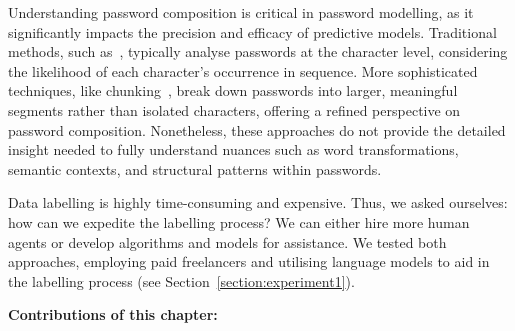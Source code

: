 

Understanding password composition is critical in password modelling, as it significantly impacts the precision and efficacy of predictive models. Traditional methods, such as~\cite{narayanan_fast_2005}, typically analyse passwords at the character level, considering the likelihood of each character's occurrence in sequence. More sophisticated techniques, like chunking~\cite{Xu_Wang_Yu_Zhang_Zhang_Han_2021}, break down passwords into larger, meaningful segments rather than isolated characters, offering a refined perspective on password composition. Nonetheless, these approaches do not provide the detailed insight needed to fully understand nuances such as word transformations, semantic contexts, and structural patterns within passwords.

Data labelling is highly time-consuming and expensive. Thus, we asked ourselves: how can we expedite the labelling process? We can either hire more human agents or develop algorithms and models for assistance. We tested both approaches, employing paid freelancers and utilising language models to aid in the labelling process (see Section~\ref{section:experiment1}).


\textbf{Contributions of this chapter:}

